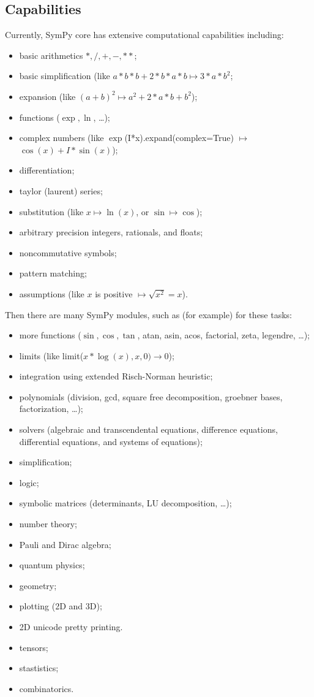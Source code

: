 \documentclass[12pt]{article}
\begin{document}
\subsection{Capabilities}

Currently, SymPy core has extensive computational capabilities including:

\begin{itemize}
\item
    basic arithmetics $*,/,+,-,**$;
\item
    basic simplification (like $a*b*b + 2*b*a*b \mapsto 3*a*b^2$;
\item
    expansion (like $(a+b)^2 \mapsto a^2 + 2*a*b + b^2$);
\item
    functions ($\exp, \ln$, \dots);
\item
    complex numbers (like $\exp$(I*x).expand(complex=True) $\mapsto$
    $\cos(x)+I*\sin(x)$);
\item
    differentiation;
\item
    taylor (laurent) series;
\item
    substitution (like $x \mapsto \ln(x)$, or $\sin \mapsto \cos$);
\item
    arbitrary precision integers, rationals, and floats;
\item
    noncommutative symbols;
\item
    pattern matching;
\item
    assumptions (like $x$ is positive $\mapsto \sqrt{x^2} = x$).
\end{itemize}
Then there are many SymPy modules, such as (for example) for these tasks:
\begin{itemize}
\item
    more functions ($\sin, \cos, \tan$, atan, asin, acos, factorial, zeta, legendre, \ldots);
\item
    limits (like limit($x*\log(x), x, 0) \to 0$);
\item
    integration using extended Risch-Norman heuristic;
\item
    polynomials (division, gcd, square free decomposition, groebner bases, factorization, \ldots);
\item
    solvers (algebraic and transcendental equations, difference equations, differential equations, and systems of equations);
\item
    simplification;
\item
    logic;
\item
    symbolic matrices (determinants, LU decomposition, \ldots);
\item
    number theory;
\item
    Pauli and Dirac algebra;
\item
    quantum physics;
\item
    geometry;
\item
    plotting (2D and 3D);
\item
    2D unicode pretty printing.
\item
    tensors;
\item
    stastistics;
\item
    combinatorics.
\end{itemize}
\end{document}
